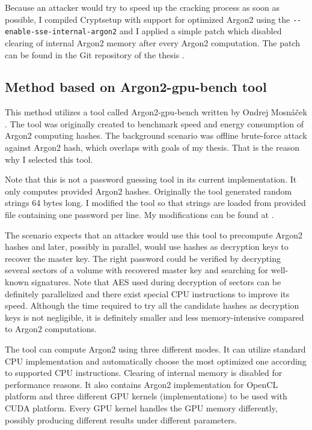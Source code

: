 \documentclass[nolof,digital]{fithesis3}
\begin{document}
Because an attacker would try to speed up the cracking process as soon as possible, I compiled Cryptsetup with support for optimized Argon2 using the \verb+--enable-sse-internal-argon2+ and I applied a simple patch which disabled clearing of internal Argon2 memory after every Argon2 computation. The patch can be found in the Git repository of the thesis \parencite{thesisrepo}.

\subsection{Method based on Argon2-gpu-bench tool}
This method utilizes a tool called Argon2-gpu-bench written by Ondrej Mosnáček \parencite{argon2gpu}. The tool was originally created to benchmark speed and energy consumption of Argon2 computing hashes. The background scenario was offline brute-force attack against Argon2 hash, which overlaps with goals of my thesis. That is the reason why I selected this tool.

Note that this is not a password guessing tool in its current implementation. It only computes provided Argon2 hashes. Originally the tool generated random strings 64 bytes long. I modified the tool so that strings are loaded from provided file containing one password per line. My modifications can be found at \parencite{argon2gpuvojta}.

The scenario expects that an attacker would use this tool to precompute Argon2 hashes and later, possibly in parallel, would use hashes as decryption keys to recover the master key. The right password could be verified by decrypting several sectors of a volume with recovered master key and searching for well-known signatures. Note that AES used during decryption of sectors can be definitely parallelized and there exist special CPU instructions to improve its speed. Although the time required to try all the candidate hashes as decryption keys is not negligible, it is definitely smaller and less memory-intensive compared to Argon2 computations.

The tool can compute Argon2 using three different modes. It can utilize standard CPU implementation and automatically choose the most optimized one according to supported CPU instructions. Clearing of internal memory is disabled for performance reasons. It also contains Argon2 implementation for OpenCL platform and three different GPU kernels (implementations) to be used with CUDA platform. Every GPU kernel handles the GPU memory differently, possibly producing different results under different parameters.
\end{document}
